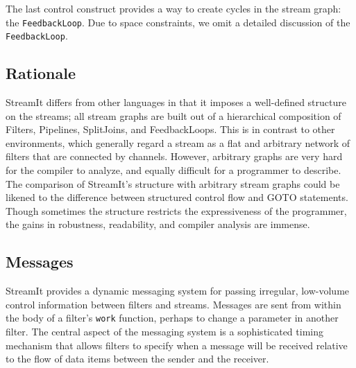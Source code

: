 The last control construct provides a way to create cycles in the
stream graph: the {\tt FeedbackLoop}.  Due to space constraints, we
omit a detailed discussion of the {\tt FeedbackLoop}.

\subsection{Rationale}

StreamIt differs from other languages in that it imposes a
well-defined structure on the streams; all stream graphs are built out
of a hierarchical composition of Filters, Pipelines, SplitJoins, and
FeedbackLoops.  This is in contrast to other environments, which
generally regard a stream as a flat and arbitrary network of filters
that are connected by channels.  However, arbitrary graphs are very
hard for the compiler to analyze, and equally difficult for a
programmer to describe.  The comparison of StreamIt's structure with
arbitrary stream graphs could be likened to the difference between
structured control flow and GOTO statements.  Though sometimes the
structure restricts the expressiveness of the programmer, the gains in
robustness, readability, and compiler analysis are immense.

\subsection{Messages}

StreamIt provides a dynamic messaging system for passing irregular,
low-volume control information between filters and streams.  Messages
are sent from within the body of a filter's {\tt work} function,
perhaps to change a parameter in another filter.  The central aspect
of the messaging system is a sophisticated timing mechanism that
allows filters to specify when a message will be received relative to
the flow of data items between the sender and the receiver.